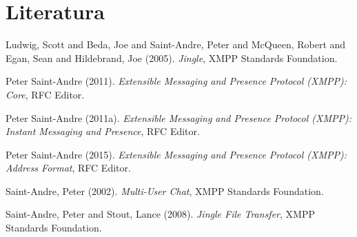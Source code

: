\documentclass[11pt]{article}
\begin{document}
\section{Literatura}
\label{sec:org27e73a8}

\noindent
Ludwig, Scott and Beda, Joe and Saint-Andre, Peter and McQueen, Robert and Egan, Sean and Hildebrand, Joe (2005). \emph{Jingle}, XMPP Standards Foundation.

\noindent
Peter Saint-Andre (2011). \emph{{Extensible Messaging and Presence Protocol (XMPP): Core}}, RFC Editor.

\noindent
Peter Saint-Andre (2011a). \emph{{Extensible Messaging and Presence Protocol (XMPP): Instant Messaging and Presence}}, RFC Editor.

\noindent
Peter Saint-Andre (2015). \emph{{Extensible Messaging and Presence Protocol (XMPP): Address Format}}, RFC Editor.

\noindent
Saint-Andre, Peter (2002). \emph{Multi-User Chat}, XMPP Standards Foundation.

\noindent
Saint-Andre, Peter and Stout, Lance (2008). \emph{Jingle File Transfer}, XMPP Standards Foundation.
\end{document}
